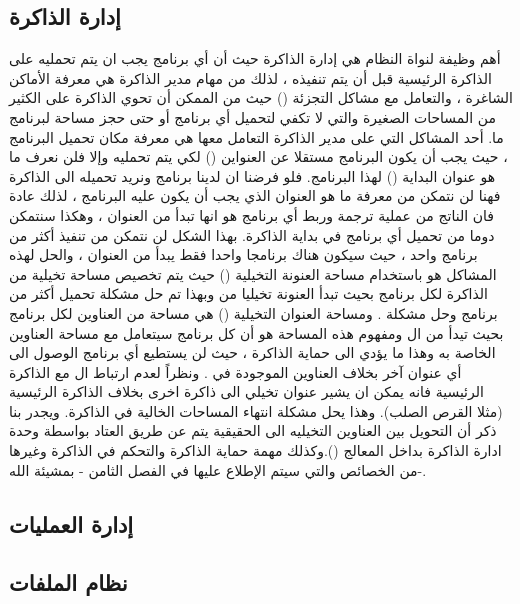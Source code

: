 \documentclass[document.tex]{subfiles}
\begin{document}
\subsection{إدارة الذاكرة}
أهم وظيفة لنواة النظام هي إدارة الذاكرة حيث أن أي برنامج يجب ان يتم تحمليه على الذاكرة الرئيسية قبل أن يتم تنفيذه ، لذلك من مهام مدير الذاكرة هي معرفة الأماكن الشاغرة ، والتعامل مع مشاكل التجزئة () حيث من الممكن أن تحوي الذاكرة على الكثير من المساحات الصغيرة والتي لا تكفي لتحميل أي برنامج أو حتى حجز مساحة لبرنامج ما.
أحد المشاكل التي على مدير الذاكرة التعامل معها هي معرفة مكان تحميل البرنامج ، حيث يجب أن يكون البرنامج مستقلا عن العنواين  () لكي يتم تحمليه  وإلا فلن نعرف ما هو عنوان البداية () لهذا البرنامج.
فلو فرضنا ان لدينا برنامج  ونريد تحميله الى الذاكرة فهنا لن نتمكن من معرفة ما هو العنوان الذي يجب أن يكون عليه البرنامج ، لذلك عادة فان الناتج من عملية ترجمة وربط أي برنامج هو انها تبدأ من العنوان ، وهكذا سنتمكن دوما من تحميل أي برنامج في بداية الذاكرة.
بهذا الشكل لن نتمكن من تنفيذ أكثر من برنامج واحد ، حيث سيكون هناك برنامجا واحدا فقط يبدأ من العنوان  ، والحل لهذه المشاكل هو باستخدام مساحة العنونة التخيلية () حيث يتم تخصيص مساحة تخيلية من الذاكرة لكل برنامج بحيث تبدأ العنونة تخيليا من  وبهذا تم حل مشكلة تحميل أكثر من برنامج وحل مشكلة .
ومساحة العنوان التخيلية () هي مساحة من العناوين لكل برنامج بحيث تيدأ من ال  ومفهوم هذه المساحة هو أن كل برنامج سيتعامل مع مساحة العناوين الخاصة به وهذا ما يؤدي الى حماية الذاكرة ، حيث لن يستطيع أي برنامج الوصول الى أي عنوان آخر بخلاف العناوين الموجودة في .
ونظراً لعدم ارتباط ال  مع الذاكرة الرئيسية فانه يمكن ان يشير عنوان تخيلي الى ذاكرة اخرى بخلاف الذاكرة الرئيسية (مثلا القرص الصلب). وهذا يحل مشكلة انتهاء المساحات الخالية في الذاكرة.
ويجدر بنا ذكر أن التحويل بين العناوين التخيليه الى الحقيقية يتم عن طريق العتاد بواسطة وحدة ادارة الذاكرة بداخل المعالج ().وكذلك مهمة حماية الذاكرة والتحكم في الذاكرة  وغيرها من الخصائص والتي سيتم الإطلاع عليها في الفصل الثامن - بمشيئة الله-.


\subsection{إدارة العمليات}

\subsection{نظام الملفات}
\end{document}
